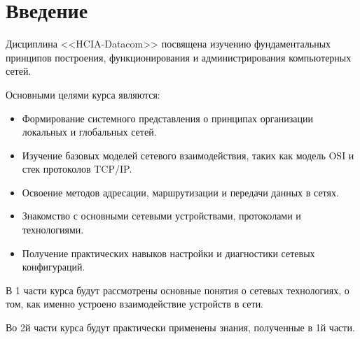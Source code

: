 \chapter*{Введение}
\label{ch:intro_sync}

Дисциплина <<HCIA-Datacom>> посвящена изучению фундаментальных принципов построения, функционирования и администрирования компьютерных сетей. 

Основными целями курса являются:

\begin{itemize}
    \item Формирование системного представления о принципах организации локальных и глобальных сетей.
    \item Изучение базовых моделей сетевого взаимодействия, таких как модель OSI и стек протоколов TCP/IP.
    \item Освоение методов адресации, маршрутизации и передачи данных в сетях.
    \item Знакомство с основными сетевыми устройствами, протоколами и технологиями.
    \item Получение практических навыков настройки и диагностики сетевых конфигураций.
\end{itemize}

В 1 части курса будут рассмотрены основные понятия о сетевых технологиях, о том, как именно устроено взаимодействие устройств в сети.

Во 2й части курса будут практически применены знания, полученные в 1й части.
